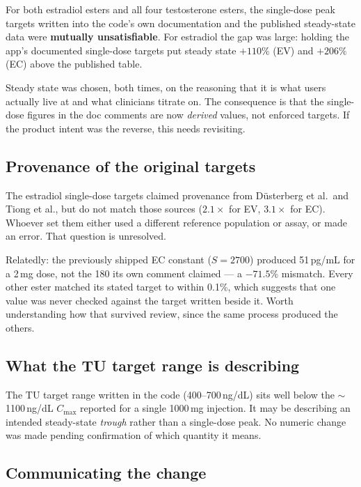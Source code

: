 \documentclass[11pt,a4paper]{article}
\begin{document}
For both estradiol esters and all four testosterone esters, the single-dose peak
targets written into the code's own documentation and the published steady-state
data were \textbf{mutually unsatisfiable}. For estradiol the gap was large:
holding the app's documented single-dose targets put steady state $+110\%$ (EV)
and $+206\%$ (EC) above the published table.

Steady state was chosen, both times, on the reasoning that it is what users
actually live at and what clinicians titrate on. The consequence is that the
single-dose figures in the doc comments are now \emph{derived} values, not
enforced targets. If the product intent was the reverse, this needs revisiting.

\subsection{Provenance of the original targets}

The estradiol single-dose targets claimed provenance from Düsterberg et al.\ and
Tiong et al., but do not match those sources ($2.1\times$ for EV, $3.1\times$ for
EC). Whoever set them either used a different reference population or assay, or
made an error. That question is unresolved.

Relatedly: the previously shipped EC constant ($S = 2700$) produced 51\,pg/mL for
a 2\,mg dose, not the 180 its own comment claimed --- a $-71.5\%$ mismatch. Every
other ester matched its stated target to within 0.1\%, which suggests that one
value was never checked against the target written beside it. Worth understanding
how that survived review, since the same process produced the others.

\subsection{What the TU target range is describing}

The TU target range written in the code (400--700\,ng/dL) sits well below the
$\sim$1100\,ng/dL $C_{\max}$ reported for a single 1000\,mg injection. It may be
describing an intended steady-state \emph{trough} rather than a single-dose peak.
No numeric change was made pending confirmation of which quantity it means.

\subsection{Communicating the change}
\end{document}
